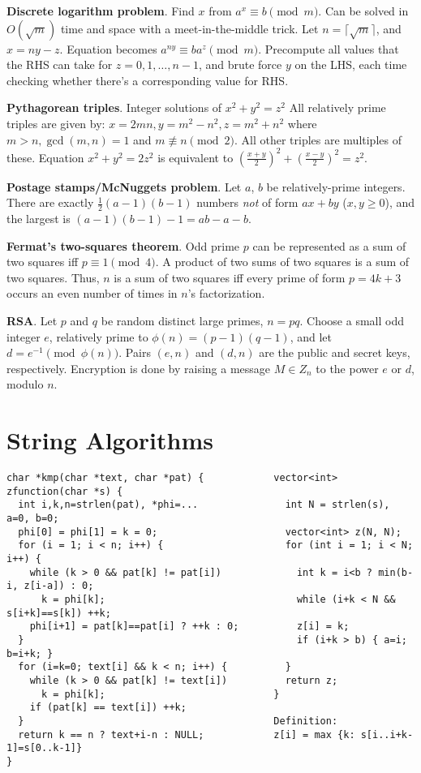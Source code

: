 \documentclass[a4paper, 12pt]{article}
\let\ge=\geqslant
\newcommand{\Section}[1]{
  \section*{#1}
  \addcontentsline{toc}{subsection}{#1}
  \vspace{-3mm}
}
\newcommand{\Topic}[1]{\textbf{#1}}
\begin{document}
\Topic{Discrete logarithm problem}.  Find $x$ from $a^x \equiv b \pmod{m}$.
Can be solved in $O(\sqrt{m})$ time and space with a meet-in-the-middle trick.
Let $n = \lceil \sqrt{m} \rceil$, and $x = ny - z$.
Equation becomes $a^{ny} \equiv b a^z \pmod{m}$.  Precompute all values that
the RHS can take for $z = 0, 1, \dots, n-1$, and brute force $y$ on the LHS,
each time checking whether there's a corresponding value for RHS.

\Topic{Pythagorean triples}.  Integer solutions of $x^2 + y^2 = z^2$
All relatively prime triples are given by:
$x=2mn, y=m^2-n^2, z=m^2+n^2$ where $m>n, \gcd(m,n)=1$ and $m \not\equiv n \pmod{2}$.
All other triples are multiples of these.
Equation $x^2 + y^2 = 2z^2$ is equivalent to $(\frac{x+y}{2})^2 + (\frac{x-y}{2})^2 = z^2$.

\Topic{Postage stamps/McNuggets problem}.  Let $a$, $b$ be relatively-prime integers.
There are exactly $\frac{1}{2}(a-1)(b-1)$ numbers \emph{not} of form $ax+by$ ($x,y \ge 0$),
and the largest is $(a-1)(b-1)-1 = ab - a - b$.

\Topic{Fermat's two-squares theorem}.  Odd prime $p$ can be represented
as a sum of two squares iff $p \equiv 1 {\pmod 4}$.
A product of two sums of two squares is a sum of two squares.
Thus, $n$ is a sum of two squares iff every prime of
form $p=4k+3$ occurs an even number of times in $n$'s factorization.

\Topic{RSA}. Let $p$ and $q$ be random distinct large primes, $n = pq$.
Choose a small odd integer $e$, relatively prime to $\phi(n) = (p-1)(q-1)$,
and let $d = e^{-1} \pmod{\phi(n)}$. Pairs $(e,n)$ and $(d,n)$ are
the public and secret keys, respectively.
Encryption is done by raising a message $M \in Z_n$ to the power $e$ or $d$,
modulo $n$.



\newpage
\Section{String Algorithms}

\begin{Verbatim}[fontsize=\small]
char *kmp(char *text, char *pat) {            vector<int> zfunction(char *s) {
  int i,k,n=strlen(pat), *phi=...               int N = strlen(s), a=0, b=0;
  phi[0] = phi[1] = k = 0;                      vector<int> z(N, N);
  for (i = 1; i < n; i++) {                     for (int i = 1; i < N; i++) {
    while (k > 0 && pat[k] != pat[i])             int k = i<b ? min(b-i, z[i-a]) : 0;
      k = phi[k];                                 while (i+k < N && s[i+k]==s[k]) ++k;
    phi[i+1] = pat[k]==pat[i] ? ++k : 0;          z[i] = k;
  }                                               if (i+k > b) { a=i; b=i+k; }
  for (i=k=0; text[i] && k < n; i++) {          }
    while (k > 0 && pat[k] != text[i])          return z;
      k = phi[k];                             }
    if (pat[k] == text[i]) ++k;                
  }                                           Definition:
  return k == n ? text+i-n : NULL;            z[i] = max {k: s[i..i+k-1]=s[0..k-1]}
}
\end{Verbatim}
\vspace{-3mm}
\end{document}
